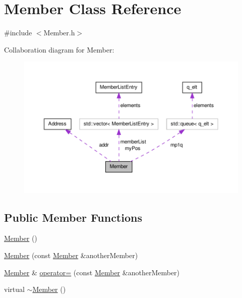 \hypertarget{class_member}{\section{\-Member \-Class \-Reference}
\label{df/dbc/class_member}
}


{\ttfamily \#include $<$\-Member.\-h$>$}



\-Collaboration diagram for \-Member\-:
\nopagebreak
\begin{figure}[H]
\begin{center}
\leavevmode
\includegraphics[width=350pt]{d1/d93/class_member__coll__graph}
\end{center}
\end{figure}
\subsection*{\-Public \-Member \-Functions}
\begin{DoxyCompactItemize}
\item 
\hyperlink{class_member_a44241aa6aa9b792b550d9cc29e7ad050}{\-Member} ()
\item 
\hyperlink{class_member_ad581ba97ca2f62a40d948b6f1ce4d018}{\-Member} (const \hyperlink{class_member}{\-Member} \&another\-Member)
\item 
\hyperlink{class_member}{\-Member} \& \hyperlink{class_member_af7884cb93b9fcfaefb65b76151daadf0}{operator=} (const \hyperlink{class_member}{\-Member} \&another\-Member)
\item 
virtual \hyperlink{class_member_a9e993260f63c73a91f1cb9b55fcef903}{$\sim$\-Member} ()
\end{DoxyCompactItemize}
